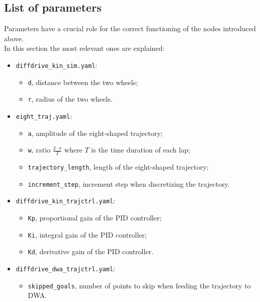 \documentclass[11pt,a4paper]{article}
\begin{document}
\subsection{List of parameters}

Parameters have a crucial role for the correct functioning of the nodes introduced above.\\

In this section the most relevant ones are explained:\\
\begin{itemize}

    \item \texttt{diffdrive\_kin\_sim.yaml}:
        \begin{itemize}
            \item \texttt{d}, distance between the two wheels;
            \item \texttt{r}, radius of the two wheels.\\
        \end{itemize}

    \item \texttt{eight\_traj.yaml}:
        \begin{itemize}
            \item \texttt{a}, amplitude of the eight-shaped trajectory;
            \item \texttt{w}, ratio $\frac{2 \cdot \pi }{T}$ where $T$ is the time duration of each lap;
            \item \texttt{trajectory\_length}, length of the eight-shaped trajectory;
            \item \texttt{increment\_step}, increment step when discretizing the trajectory.\\
        \end{itemize}

    \item \texttt{diffdrive\_kin\_trajctrl.yaml}:
        \begin{itemize}
            \item \texttt{Kp}, proportional gain of the PID controller;
            \item \texttt{Ki}, integral gain of the PID controller;
            \item \texttt{Kd}, derivative gain of the PID controller.\\
        \end{itemize}

    \item \texttt{diffdrive\_dwa\_trajctrl.yaml}:
        \begin{itemize}
            \item \texttt{skipped\_goals}, number of points to skip when feeding the trajectory to DWA.\\
        \end{itemize}


\end{itemize}
\end{document}
